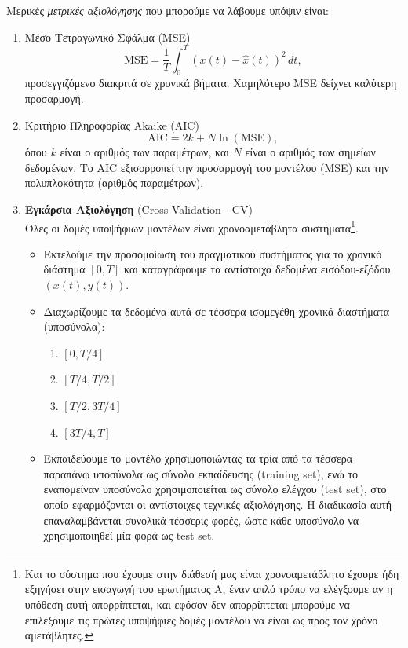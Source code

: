 \documentclass[12pt]{article} %
\numberwithin{equation}{section}  %
\begin{document}
Μερικές \textit{μετρικές αξιολόγησης} που μπορούμε να λάβουμε υπόψιν είναι:
\begin{enumerate}
    \item Μέσο Τετραγωνικό Σφάλμα (MSE) \\
        \[
        \text{MSE} = \frac{1}{T} \int_0^T (x(t) - \hat{x}(t))^2 \, dt,
        \]
        προσεγγιζόμενο διακριτά σε χρονικά βήματα. Χαμηλότερο MSE δείχνει καλύτερη προσαρμογή.
    
    \item Κριτήριο Πληροφορίας Akaike (AIC) \\
        \[
        \text{AIC} = 2k + N \ln(\text{MSE}),
        \]
        όπου \(k\) είναι ο αριθμός των παραμέτρων, και \(N\) είναι ο αριθμός των σημείων δεδομένων. Το AIC εξισορροπεί την προσαρμογή του μοντέλου (MSE) και την πολυπλοκότητα (αριθμός παραμέτρων).
        
    \item \textbf{Εγκάρσια Αξιολόγηση} (Cross Validation - CV) \\
        Όλες οι δομές υποψήφιων μοντέλων είναι χρονοαμετάβλητα συστήματα\footnote{
        Και το σύστημα που έχουμε στην διάθεσή μας είναι χρονοαμετάβλητο\textemdash 
        έχουμε ήδη εξηγήσει στην εισαγωγή του ερωτήματος Α, έναν απλό τρόπο να ελέγξουμε αν η υπόθεση αυτή απορρίπτεται, 
        και εφόσον δεν απορρίπτεται μπορούμε να επιλέξουμε τις πρώτες υποψήφιες δομές μοντέλου 
        να είναι ως προς τον χρόνο αμετάβλητες.
        }. 
        \begin{itemize}[nolistsep, noitemsep]
            \item Εκτελούμε την προσομοίωση του πραγματικού συστήματος για το χρονικό διάστημα $[0, T]$ 
            και καταγράφουμε τα αντίστοιχα δεδομένα εισόδου-εξόδου $(x(t), y(t))$.

            \item Διαχωρίζουμε τα δεδομένα αυτά σε τέσσερα ισομεγέθη χρονικά διαστήματα (υποσύνολα):
            \begin{enumerate}
                \item $[0, T/4]$
                \item $[T/4, T/2]$
                \item $[T/2, 3T/4]$
                \item $[3T/4, T]$
            \end{enumerate}

            \item Εκπαιδεύουμε το μοντέλο χρησιμοποιώντας τα τρία από τα τέσσερα παραπάνω υποσύνολα ως σύνολο εκπαίδευσης (training set), 
            ενώ το εναπομείναν υποσύνολο χρησιμοποιείται ως σύνολο ελέγχου (test set), 
            στο οποίο εφαρμόζονται οι αντίστοιχες τεχνικές αξιολόγησης. 
            Η διαδικασία αυτή επαναλαμβάνεται συνολικά τέσσερις φορές, ώστε κάθε υποσύνολο να χρησιμοποιηθεί 
            μία φορά ως test set.
        \end{itemize}
        
\end{enumerate}
\end{document}
